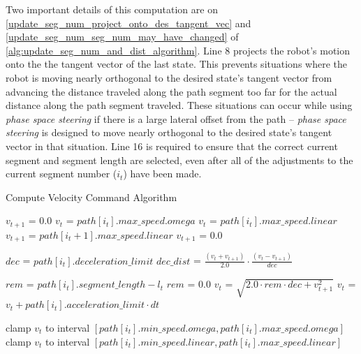 Two important details of this computation are on \autoref{update_seg_num_project_onto_des_tangent_vec} and \autoref{update_seg_num_seg_num_may_have_changed} of \autoref{alg:update_seg_num_and_dist_algorithm}. Line 8 projects the robot's motion onto the the tangent vector of the last state. This prevents situations where the robot is moving nearly orthogonal to the desired state's tangent vector from advancing the distance traveled along the path segment too far for the actual distance along the path segment traveled. These situations can occur while using \emph{phase space steering} if there is a large lateral offset from the path -- \emph{phase space steering} is designed to move nearly orthogonal to the desired state's tangent vector in that situation. Line 16 is required to ensure that the correct current segment and segment length are selected, even after all of the adjustments to the current segment number ($i_t$) have been made.

\begin{algorithm}
\caption{Compute Velocity Command Algorithm}
\label{alg:compute_velocity_command_algorithm}
\DontPrintSemicolon


{
	$v_{t+1}$ = $0.0$ \;
	$v_t$ = $path\left[i_t\right].max\_speed.omega$ \;
}
{
	$v_t$ = $path\left[i_t\right].max\_speed.linear$ \;
	{
		$v_{t+1}$ = $path\left[i_t + 1 \right].max\_speed.linear$ \;
	}
	{
		$v_{t+1}$ = $0.0$ \;
	}
}

$dec$ = $path\left[i_t\right].deceleration\_limit$ \;
$dec\_dist$ = $\frac{\left( v_t + v_{t+1} \right)}{2.0} \cdot \frac{\left( v_t - v_{t+1} \right)}{dec}$ \;

$rem$ = $path\left[i_t\right].segment\_length - l_t$ \;
{
	$rem$ = $0.0$ \;
}
{
	$v_t$ = $\sqrt{2.0 \cdot rem \cdot dec + v_{t+1}^2}$ \;
}
\Else
{
	$v_t$ = $v_t + path\left[i_t\right].acceleration\_limit \cdot dt$ \;
}

{
	clamp $v_t$ to interval $\left[ path\left[i_t\right].min\_speed.omega, path\left[i_t\right].max\_speed.omega \right]$ \;
}
{
	clamp $v_t$ to interval $\left[ path\left[i_t\right].min\_speed.linear, path\left[i_t\right].max\_speed.linear \right]$ \;
}

\end{algorithm}

